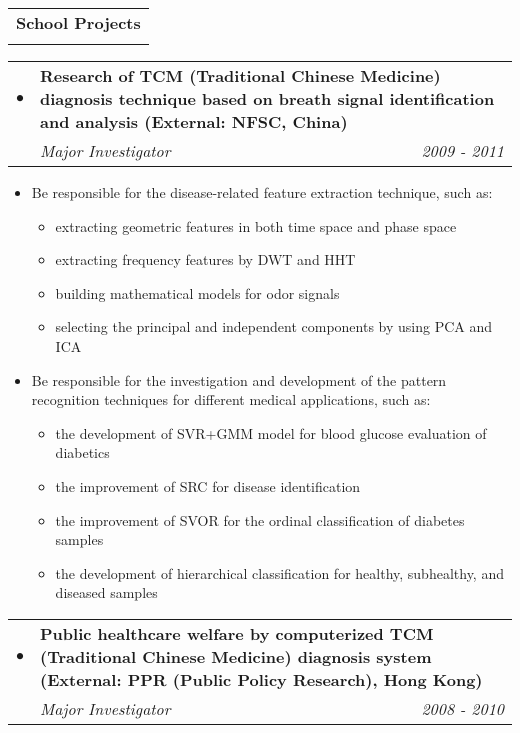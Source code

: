 \documentclass[letterpaper,11pt]{report}
\makeatletter
\newcommand{\resitem}[1]{\item #1 \vspace{-2pt}}
\newcommand{\resheading}[1]{
\vspace{6pt}\begin{tabular*}{6.71in}{l@{\extracolsep{\fill}}}
        \large {\textbf{#1}} \\
        \Xhline{1.2pt}
\end{tabular*}\vspace{-2pt}}
\newcommand{\ressubheadingthr}[3]{
\begin{tabular*}{6.9in}{llr}
        \hspace{0.15in} $\bullet$ \hspace{0.05in} & \multicolumn{2}{p{6.54in}}{\textbf{#1}} \\
        & \textit{#2} & \textit{#3} \\
\end{tabular*}\vspace{-4pt}}
\makeatother
\begin{document}
\resheading{School Projects}
\begin{description}
\item
    \ressubheadingthr{Research of TCM (Traditional Chinese Medicine) diagnosis technique based on breath signal identification and analysis (External: NFSC, China)}{Major Investigator}{2009 - 2011}
    \begin{itemize}
        \resitem{Be responsible for the disease-related feature extraction technique, such as:
             \begin{itemize}
             \resitem{extracting geometric features in both time space and phase space}
             \resitem{extracting frequency features by DWT and HHT}
             \resitem{building mathematical models for odor signals}
             \resitem{selecting the principal and independent components by using PCA and ICA}}\end{itemize}
        \resitem{Be responsible for the investigation and development of the pattern recognition techniques for different medical applications, such as:
             \begin{itemize}
             \resitem{the development of SVR+GMM model for blood glucose evaluation of diabetics}
             \resitem{the improvement of SRC for disease identification}
             \resitem{the improvement of SVOR for the ordinal classification of diabetes samples}
             \resitem{the development of hierarchical classification for healthy, subhealthy, and diseased samples}}\end{itemize}
    \end{itemize}
\item
    \ressubheadingthr{Public healthcare welfare by computerized TCM (Traditional Chinese Medicine) diagnosis system (External: PPR (Public Policy Research), Hong Kong)}{Major Investigator}{2008 - 2010}

\end{description}
\end{document}
